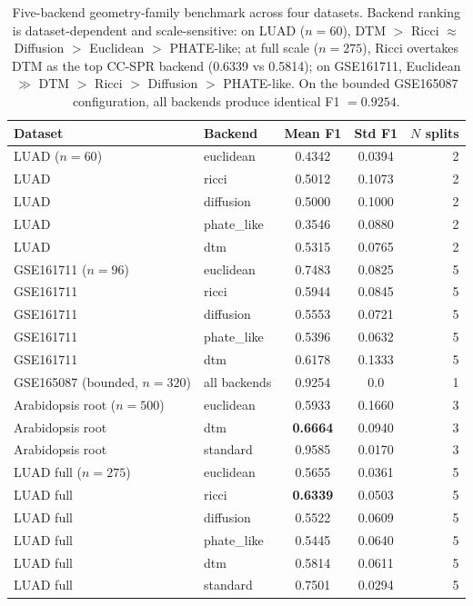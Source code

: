 \documentclass[11pt]{article}
\begin{document}
\begin{table}[h]
\centering
\small
\begin{tabular}{llccr}
\toprule
Dataset & Backend & Mean F1 & Std F1 & $N$ splits \\
\midrule
LUAD ($n=60$) & euclidean & 0.4342 & 0.0394 & 2 \\
LUAD & ricci & 0.5012 & 0.1073 & 2 \\
LUAD & diffusion & 0.5000 & 0.1000 & 2 \\
LUAD & phate\_like & 0.3546 & 0.0880 & 2 \\
LUAD & dtm & 0.5315 & 0.0765 & 2 \\
\midrule
GSE161711 ($n=96$) & euclidean & 0.7483 & 0.0825 & 5 \\
GSE161711 & ricci & 0.5944 & 0.0845 & 5 \\
GSE161711 & diffusion & 0.5553 & 0.0721 & 5 \\
GSE161711 & phate\_like & 0.5396 & 0.0632 & 5 \\
GSE161711 & dtm & 0.6178 & 0.1333 & 5 \\
\midrule
GSE165087 (bounded, $n=320$) & all backends & 0.9254 & 0.0 & 1 \\
\midrule
Arabidopsis root ($n=500$) & euclidean & 0.5933 & 0.1660 & 3 \\
Arabidopsis root & dtm & \textbf{0.6664} & 0.0940 & 3 \\
Arabidopsis root & standard & 0.9585 & 0.0170 & 3 \\
\midrule
LUAD full ($n=275$) & euclidean & 0.5655 & 0.0361 & 5 \\
LUAD full & ricci & \textbf{0.6339} & 0.0503 & 5 \\
LUAD full & diffusion & 0.5522 & 0.0609 & 5 \\
LUAD full & phate\_like & 0.5445 & 0.0640 & 5 \\
LUAD full & dtm & 0.5814 & 0.0611 & 5 \\
LUAD full & standard & 0.7501 & 0.0294 & 5 \\
\bottomrule
\end{tabular}
\caption{Five-backend geometry-family benchmark across four datasets.
Backend ranking is dataset-dependent and scale-sensitive: on LUAD ($n=60$), DTM $>$ Ricci $\approx$ Diffusion $>$ Euclidean $>$ PHATE-like; at full scale ($n=275$), Ricci overtakes DTM as the top CC-SPR backend (0.6339 vs 0.5814); on GSE161711, Euclidean $\gg$ DTM $>$ Ricci $>$ Diffusion $>$ PHATE-like.
On the bounded GSE165087 configuration, all backends produce identical F1 $= 0.9254$.}
\label{tab:geobench}
\end{table}
\end{document}
